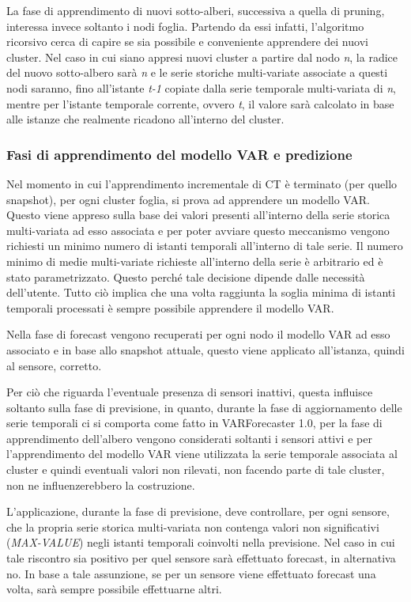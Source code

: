 \documentclass[12pt,a4paper,twoside,openright]{book}
\begin{document}
La fase di apprendimento di nuovi sotto-alberi, successiva a quella di pruning, interessa invece soltanto i nodi foglia. Partendo da essi infatti, l'algoritmo ricorsivo cerca di capire se sia possibile e conveniente apprendere dei nuovi cluster.
Nel caso in cui siano appresi nuovi cluster a partire dal nodo \textit{n}, la radice del nuovo sotto-albero sarà \textit{n} e le serie storiche multi-variate associate a questi nodi saranno, fino all'istante \textit{t-1} copiate dalla serie temporale multi-variata di \textit{n}, mentre per l'istante temporale corrente, ovvero \textit{t}, il valore sarà calcolato in base alle istanze che realmente ricadono all'interno del cluster.  
\subsubsection{Fasi di apprendimento del modello VAR e predizione}
Nel momento in cui l'apprendimento incrementale di CT è terminato (per quello snapshot), per ogni cluster foglia, si prova ad apprendere un modello VAR. Questo viene appreso sulla base dei valori presenti all'interno della serie storica multi-variata ad esso associata e per poter avviare questo meccanismo vengono richiesti un minimo numero di istanti temporali all'interno di tale serie. Il numero minimo di medie multi-variate richieste all'interno della serie è arbitrario ed è stato parametrizzato. Questo perché tale decisione dipende dalle necessità dell'utente. Tutto ciò implica che una volta raggiunta la soglia minima di istanti temporali processati è sempre possibile apprendere il modello VAR.

Nella fase di forecast vengono recuperati per ogni nodo il modello VAR ad esso associato e in base allo snapshot attuale, questo viene applicato all'istanza, quindi al sensore, corretto. 

Per ciò che riguarda l'eventuale presenza di sensori inattivi, questa influisce soltanto sulla fase di previsione, in quanto, durante la fase di aggiornamento delle serie temporali ci si comporta come fatto in VARForecaster 1.0, per la fase di apprendimento dell'albero vengono considerati soltanti i sensori attivi e per l'apprendimento del modello VAR viene utilizzata la serie temporale associata al cluster e quindi eventuali valori non rilevati, non facendo parte di tale cluster, non ne influenzerebbero la costruzione. 

L'applicazione, durante la fase di previsione, deve controllare, per ogni sensore, che la propria serie storica multi-variata non contenga valori non significativi (\textit{MAX-VALUE}) negli istanti temporali coinvolti nella previsione. Nel caso in cui tale riscontro sia positivo per quel sensore sarà effettuato forecast, in alternativa no. In base a tale assunzione, se per un sensore viene effettuato forecast una volta, sarà sempre possibile effettuarne altri.
\end{document}
